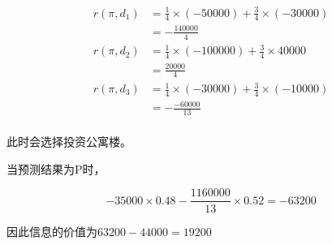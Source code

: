 \documentclass{../notes}
\begin{document}
\begin{subquestions}
        \begin{equation}
            \begin{aligned}
                r(\pi, d_1) &= \frac{1}{4}\times (-50000) + \frac{3}{4}\times (-30000) \\
                &= -\frac{140000}{4} \\
                r(\pi, d_2) &= \frac{1}{4}\times (-100000) + \frac{3}{4}\times 40000 \\
                &= \frac{20000}{4} \\
                r(\pi, d_3) &= \frac{1}{4}\times (-30000) + \frac{3}{4}\times (-10000) \\
                &= -\frac{-60000}{13} \\
            \end{aligned}
        \end{equation}

        此时会选择投资公寓楼。

        \item 当预测结果为P时，

        \begin{equation}
            -35000\times 0.48 - \frac{1160000}{13} \times 0.52 = -63200
        \end{equation}

        因此信息的价值为$63200 - 44000=19200$
    \end{subquestions}
\end{document}
